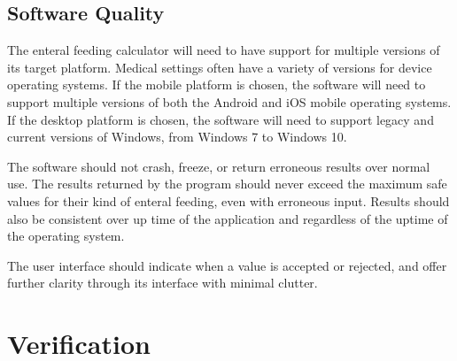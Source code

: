 \documentclass[10pt,draftclsnofoot,onecolumn]{IEEEtran}
\begin{document}
\subsection{Software Quality}
The enteral feeding calculator will need to have support for multiple versions of its target platform. Medical settings often
have a variety of versions for device operating systems. If the mobile platform is chosen, the software will need to support 
multiple versions of both the Android and iOS mobile operating systems. If the desktop platform is chosen, the software will need
to support legacy and current versions of Windows, from Windows 7 to Windows 10.

The software should not crash, freeze, or return erroneous results over normal use. The results returned by the program should never
exceed the maximum safe values for their kind of enteral feeding, even with erroneous input. Results should also be consistent over
up time of the application and regardless of the uptime of the operating system.

The user interface should indicate when a value is accepted or rejected, and offer further clarity through its interface with minimal clutter.

\section{Verification}
\end{document}
